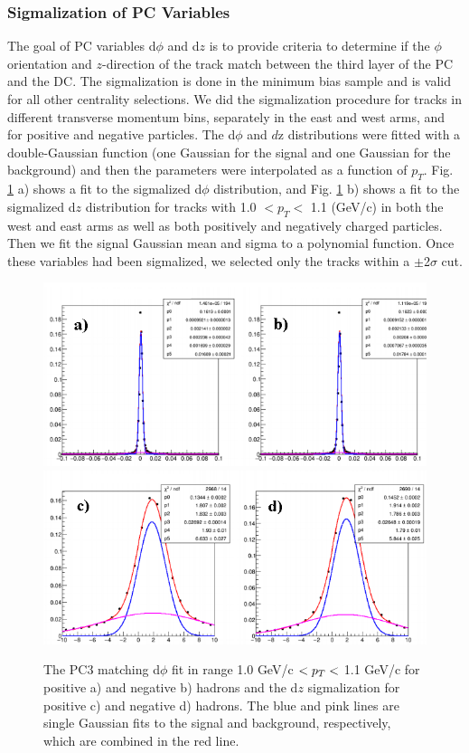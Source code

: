 \subsubsection{Sigmalization of PC Variables}
\label{sec:pc_sigmala}
The goal of PC variables d$\phi$ and d$z$ is to provide criteria to determine if the $\phi$ orientation and $z$-direction of the track match between the third layer of the PC and the DC. The sigmalization is done in the minimum bias sample and is valid for all other centrality selections.
We did the sigmalization procedure for tracks in different transverse momentum bins, separately in the east
and west arms, and for positive and negative particles. The d$\phi$ and $d$z distributions
were fitted with a double-Gaussian function (one Gaussian for the signal and one Gaussian for the background) and then the parameters were interpolated as
a function of $p_T$. Fig. \ref{fig:pc3_sig} a) shows a fit to the sigmalized
d$\phi$ distribution, and Fig. \ref{fig:pc3_sig} b) shows a fit to the sigmalized d$z$ distribution for tracks with 1.0 $< p_T <$ 1.1 (GeV/c)
in both the west and east arms as well as both positively and negatively charged particles.
Then we fit the signal Gaussian mean and sigma to a polynomial function.  Once these variables had been sigmalized, we selected only
the tracks within a $\pm$2$\sigma$ cut.

\begin{figure}[!ht]
\begin{center}
\includegraphics[scale=0.55]{figs/pc3dphi.png}
\includegraphics[scale=0.55]{figs/pc3dz.png}
\end{center}
\caption{The PC3 matching d$\phi$ fit in range 1.0 GeV/c $< \mbox{$p_T$} <$ 1.1 GeV/c for positive a) and negative b) hadrons and the d$z$ sigmalization for positive c) and negative d) hadrons. The blue and pink lines are single Gaussian fits to the signal and background, respectively, which are combined in the red line.
}
\label{fig:pc3_sig}
\end{figure}

